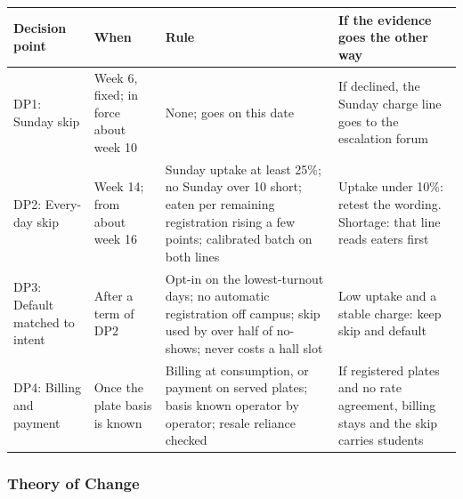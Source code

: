 \documentclass[
  10pt,
  table]{article}
\newcounter{none} %
\begin{document}
{\def\LTcaptype{none} %
\begin{longtable}[]{@{}
  >{\raggedright\arraybackslash}p{}
  >{\raggedright\arraybackslash}p{}
  >{\raggedright\arraybackslash}p{}
  >{\raggedright\arraybackslash}p{}@{}}
\toprule\noalign{}
\begin{minipage}[b]{\linewidth}\raggedright
\cellcolor{pblue}\color{white}\bfseries Decision point
\end{minipage} & \begin{minipage}[b]{\linewidth}\raggedright
\cellcolor{pblue}\color{white}\bfseries When
\end{minipage} & \begin{minipage}[b]{\linewidth}\raggedright
\cellcolor{pblue}\color{white}\bfseries Rule
\end{minipage} & \begin{minipage}[b]{\linewidth}\raggedright
\cellcolor{pblue}\color{white}\bfseries If the evidence goes the other way
\end{minipage} \\
\midrule\noalign{}
\endhead
\bottomrule\noalign{}
\endlastfoot
DP1: Sunday skip & Week 6, fixed; in force about week 10 & None; goes on this date & If declined, the Sunday charge line goes to the escalation forum \\
DP2: Every-day skip & Week 14; from about week 16 & Sunday uptake at least 25\%; no Sunday over 10 short; eaten per remaining registration rising a few points; calibrated batch on both lines & Uptake under 10\%: retest the wording. Shortage: that line reads eaters first \\
DP3: Default matched to intent & After a term of DP2 & Opt-in on the lowest-turnout days; no automatic registration off campus; skip used by over half of no-shows; never costs a hall slot & Low uptake and a stable charge: keep skip and default \\
DP4: Billing and payment & Once the plate basis is known & Billing at consumption, or payment on served plates; basis known operator by operator; resale reliance checked & If registered plates and no rate agreement, billing stays and the skip carries students \\
\end{longtable}
}

\subsubsection{Theory of Change}\label{theory-of-change}
\end{document}
